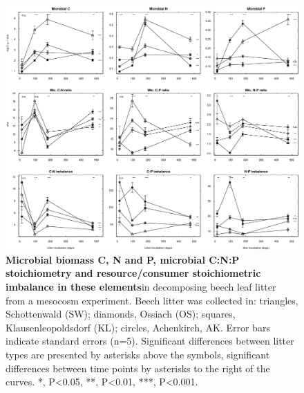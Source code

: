 \documentclass[10pt]{article}
\begin{document}
\begin{flushleft}
\begin{figure}[!ht]
\begin{center}
\includegraphics{ligpaper-mb}
\end{center}
\caption{
{\bf Microbial biomass C, N and P, microbial C:N:P stoichiometry and resource/consumer stoichiometric imbalance in these elements}in decomposing beech leaf litter from a mesocosm experiment. Beech litter was collected in: triangles, Schottenwald (SW); diamonds, Ossiach (OS); squares, Klausenleopoldsdorf (KL); circles, Achenkirch, AK. Error bars indicate standard errors (n=5). Significant differences between litter types are presented by asterisks above the symbols, significant differences between time points by asterisks to the right of the curves. *, P\textless 0.05, **, P\textless 0.01, ***, P\textless 0.001.}
\label{fig:mb}
\end{figure}


\end{flushleft}
\end{document}
